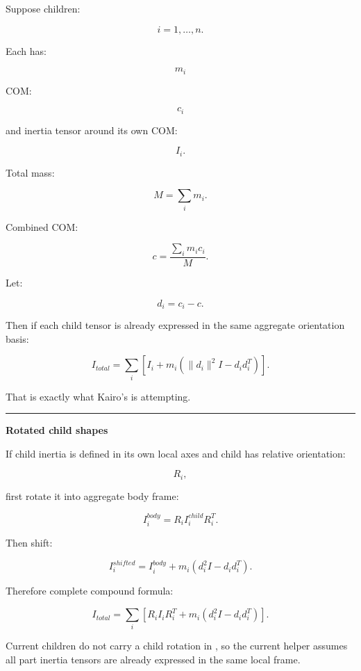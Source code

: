 \hypertarget{06-engine-ii-ch035-part-1637-composite-body-mass-properties}{}

Suppose children:

\[
i=1,\dots,n.
\]

Each has:

\[
m_i
\]

COM:

\[
c_i
\]

and inertia tensor around its own COM:

\[
I_i.
\]

Total mass:

\[
\boxed{
M=\sum_i m_i.
}
\]

Combined COM:

\[
\boxed{
c=
\frac{
\sum_i m_ic_i
}{
M
}.
}
\]

Let:

\[
d_i=c_i-c.
\]

Then if each child tensor is already expressed in the same aggregate orientation basis:

\[
\boxed{
I_{total}
=
\sum_i
\left[
I_i+
m_i
(
\|d_i\|^2I-d_id_i^T
)
\right].
}
\]

That is exactly what Kairo's  is attempting.

\begin{center}\rule{0.5\linewidth}{0.5pt}\end{center}

\textbf{Rotated child shapes}

If child inertia is defined in its own local axes and child has relative orientation:

\[
R_i,
\]

first rotate it into aggregate body frame:

\[
I_i^{body}
=
R_i
I_i^{child}
R_i^T.
\]

Then shift:

\[
I_i^{shifted}
=
I_i^{body}
+
m_i
(
d_i^2I-d_id_i^T
).
\]

Therefore complete compound formula:

\[
\boxed{
I_{total}
=
\sum_i
\left[
R_iI_iR_i^T
+
m_i
(
d_i^2I-d_id_i^T
)
\right].
}
\]

Current  children do not carry a child rotation in , so the current helper assumes all part inertia tensors are already expressed in the same local frame.

